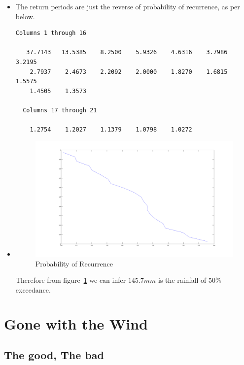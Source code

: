 \documentclass[12pt]{article}
\begin{document}
\begin{itemize}
\begin{verbatim}
  Columns 1 through 16

    0.0265    0.0739    0.1212    0.1686    0.2159    0.2633    0.3106
    0.3580    0.4053    0.4527    0.5000    0.5473    0.5947    0.6420
    0.6894    0.7367

  Columns 17 through 21

    0.7841    0.8314    0.8788    0.9261    0.9735

\end{verbatim}
\item The return periods are just the reverse of probability of
  recurrence, as per below.
\begin{verbatim}
Columns 1 through 16

   37.7143   13.5385    8.2500    5.9326    4.6316    3.7986    3.2195
    2.7937    2.4673    2.2092    2.0000    1.8270    1.6815    1.5575
    1.4505    1.3573

  Columns 17 through 21

    1.2754    1.2027    1.1379    1.0798    1.0272
\end{verbatim}
\item 
  \begin{figure}
    \centering
    \includegraphics[scale=0.3]{rain2}
    \caption{Probability of Recurrence}
    \label{fig:prob-recur}
  \end{figure}
  Therefore from figure~\ref{fig:prob-recur} we can infer $145.7mm$ is
  the rainfall of $50\%$ exceedance.
\end{itemize}

\section{Gone with the Wind}
\label{sec:it-there.-air}

\subsection{The good, The bad}
\label{sec:good-bad}
\end{document}
